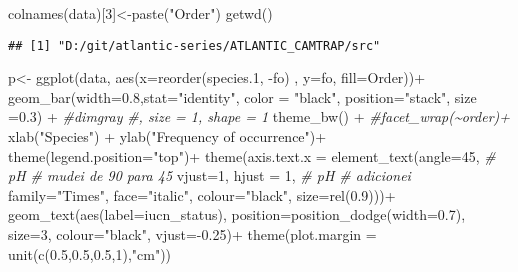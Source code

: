 \documentclass[
]{article}
\newenvironment{Shaded}{\begin{snugshade}}{\end{snugshade}}
\newcommand{\AttributeTok}[1]{\textcolor[rgb]{0.77,0.63,0.00}{#1}}
\newcommand{\CommentTok}[1]{\textcolor[rgb]{0.56,0.35,0.01}{\textit{#1}}}
\newcommand{\DecValTok}[1]{\textcolor[rgb]{0.00,0.00,0.81}{#1}}
\newcommand{\FloatTok}[1]{\textcolor[rgb]{0.00,0.00,0.81}{#1}}
\newcommand{\FunctionTok}[1]{\textcolor[rgb]{0.00,0.00,0.00}{#1}}
\newcommand{\NormalTok}[1]{#1}
\newcommand{\OtherTok}[1]{\textcolor[rgb]{0.56,0.35,0.01}{#1}}
\newcommand{\SpecialCharTok}[1]{\textcolor[rgb]{0.00,0.00,0.00}{#1}}
\newcommand{\StringTok}[1]{\textcolor[rgb]{0.31,0.60,0.02}{#1}}
\begin{document}
\begin{Shaded}
\begin{Highlighting}[]
\FunctionTok{colnames}\NormalTok{(data)[}\DecValTok{3}\NormalTok{]}\OtherTok{\textless{}{-}}\FunctionTok{paste}\NormalTok{(}\StringTok{"Order"}\NormalTok{)}
\FunctionTok{getwd}\NormalTok{()}
\end{Highlighting}
\end{Shaded}

\begin{verbatim}
## [1] "D:/git/atlantic-series/ATLANTIC_CAMTRAP/src"
\end{verbatim}

\begin{Shaded}
\begin{Highlighting}[]
\NormalTok{p}\OtherTok{\textless{}{-}} \FunctionTok{ggplot}\NormalTok{(data, }\FunctionTok{aes}\NormalTok{(}\AttributeTok{x=}\FunctionTok{reorder}\NormalTok{(species}\FloatTok{.1}\NormalTok{, }\SpecialCharTok{{-}}\NormalTok{fo) , }\AttributeTok{y=}\NormalTok{fo, }\AttributeTok{fill=}\NormalTok{Order))}\SpecialCharTok{+}
    \FunctionTok{geom\_bar}\NormalTok{(}\AttributeTok{width=}\FloatTok{0.8}\NormalTok{,}\AttributeTok{stat=}\StringTok{"identity"}\NormalTok{, }\AttributeTok{color =} \StringTok{"black"}\NormalTok{, }\AttributeTok{position=}\StringTok{"stack"}\NormalTok{, }\AttributeTok{size =}\FloatTok{0.3}\NormalTok{) }\SpecialCharTok{+} \CommentTok{\#dimgray}
    \CommentTok{\#, size = 1, shape = 1}
    \FunctionTok{theme\_bw}\NormalTok{() }\SpecialCharTok{+}
    \CommentTok{\#facet\_wrap(\textasciitilde{}order)+}
    \FunctionTok{xlab}\NormalTok{(}\StringTok{"Species"}\NormalTok{) }\SpecialCharTok{+} 
    \FunctionTok{ylab}\NormalTok{(}\StringTok{"Frequency of occurrence"}\NormalTok{)}\SpecialCharTok{+}
    \FunctionTok{theme}\NormalTok{(}\AttributeTok{legend.position=}\StringTok{"top"}\NormalTok{)}\SpecialCharTok{+}
    \FunctionTok{theme}\NormalTok{(}\AttributeTok{axis.text.x =} \FunctionTok{element\_text}\NormalTok{(}\AttributeTok{angle=}\DecValTok{45}\NormalTok{, }\CommentTok{\# pH \# mudei de 90 para 45}
    \AttributeTok{vjust=}\DecValTok{1}\NormalTok{,}
    \AttributeTok{hjust =} \DecValTok{1}\NormalTok{, }\CommentTok{\# pH \# adicionei}
    \AttributeTok{family=}\StringTok{"Times"}\NormalTok{, }\AttributeTok{face=}\StringTok{"italic"}\NormalTok{, }\AttributeTok{colour=}\StringTok{"black"}\NormalTok{, }\AttributeTok{size=}\FunctionTok{rel}\NormalTok{(}\FloatTok{0.9}\NormalTok{)))}\SpecialCharTok{+}
    \FunctionTok{geom\_text}\NormalTok{(}\FunctionTok{aes}\NormalTok{(}\AttributeTok{label=}\NormalTok{iucn\_status), }\AttributeTok{position=}\FunctionTok{position\_dodge}\NormalTok{(}\AttributeTok{width=}\FloatTok{0.7}\NormalTok{), }\AttributeTok{size=}\DecValTok{3}\NormalTok{, }\AttributeTok{colour=}\StringTok{"black"}\NormalTok{, }\AttributeTok{vjust=}\SpecialCharTok{{-}}\FloatTok{0.25}\NormalTok{)}\SpecialCharTok{+}
    \FunctionTok{theme}\NormalTok{(}\AttributeTok{plot.margin =} \FunctionTok{unit}\NormalTok{(}\FunctionTok{c}\NormalTok{(}\FloatTok{0.5}\NormalTok{,}\FloatTok{0.5}\NormalTok{,}\FloatTok{0.5}\NormalTok{,}\DecValTok{1}\NormalTok{),}\StringTok{"cm"}\NormalTok{))}


\end{Highlighting}
\end{Shaded}
\end{document}

